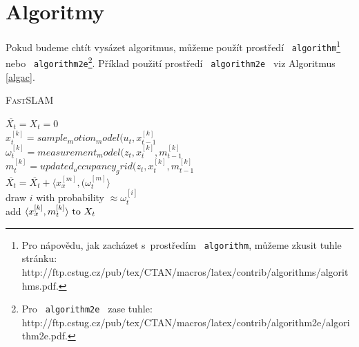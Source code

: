\documentclass[a4paper, 11pt, ]{article}
\begin{document}
\section{Algoritmy}
\label{sek-alg}
Pokud budeme chtít vysázet algoritmus, můžeme použít prostředí \texttt{ algorithm}\footnote{Pro nápovědu, jak zacházet s~prostředím \texttt{ algorithm}, můžeme zkusit tuhle stránku:
http://ftp.cstug.cz/pub/tex/CTAN/macros/latex/contrib/algorithms/algorithms.pdf.} nebo \texttt{ algorithm2e}\footnote{Pro \texttt{ algorithm2e } zase tuhle:
http://ftp.cstug.cz/pub/tex/CTAN/macros/latex/contrib/algorithm2e/algorithm2e.pdf.}.
Příklad použití prostředí \texttt{ algorithm2e } viz Algoritmus \ref{algac}.
\begin{algorithm}[h]
\label{algac}
\caption{\textsc{Fast}SLAM}
\SetNlSty{}{}{:}
\SetInd{0.5em}{0.5em}
\SetNlSkip{-1.5em}
\BlankLine
\Indp \Indp
$\overline{X_t} = X_t = 0$\\
{
	$x^{[k]}_t = sample_motion_model(u_t, x^{[k]}_{t-1}$\\
	${\omega}^{[k]}_t = measurement_model(z_t,x^{[k]}_t,m^{[k]}_{t-1}$\\
	$m^{[k]}_t = updated_occupancy_grid(z_t, x^{[k]}_t,m^{[k]}_{t-1}$\\
	$\overline{X_t} = \overline{X_t} + \langle x^{[m]}_x , ({\omega}^{[m]}_t \rangle$\\
}
{
	draw $i$ with probability $\approx {\omega}^{[i]}_t$\\
	add $\langle x^{[k]}_x,m^{[k]}_t \rangle \textnormal{ to } X_t$\\	
}
\end{algorithm}	
\end{document}
